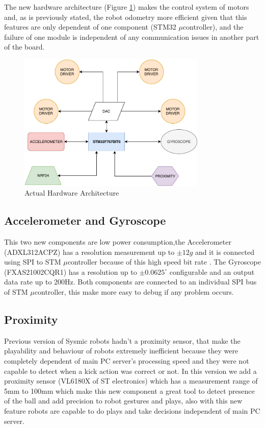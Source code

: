 \documentclass{llncs}
\begin{document}
The new hardware architecture (Figure \ref{fig:hw_new})
makes the control system of motors and, as is previously stated, the robot odometry more efficient given that this features are only dependent of one component (STM32 $\mu$controller), and the failure of one module is independent of any communication issues in another part of the board.

\begin{figure}[H]
    \centering
    \includegraphics[width=0.8\textwidth]{Images/HardwareNew.pdf}
    \caption{Actual Hardware Architecture}
    \label{fig:hw_new}
\end{figure}

\subsection{Accelerometer and Gyroscope} \label{sec:hw_accel}
\justify This two new components are low power consumption,the Accelerometer (ADXL312ACPZ) has a resolution measurement up to $\pm 12g$ and it is connected using SPI to STM $\mu$controller because of this high speed bit rate \cite{adxl312_datasheet}. The Gyroscope (FXAS21002CQR1) has a resolution up to $\pm 0.0625^\circ$ configurable and an output data rate up to 200Hz\cite{gyro_datasheet}. Both components are connected to an individual SPI bus of STM $\mu$controller, this make more easy to debug if any problem occurs.

\subsection{Proximity}
Previous version of Sysmic robots hadn't a proximity sensor, that make the playability and behaviour of robots extremely inefficient because they were completely dependent of main PC server's processing speed and they were not capable to detect when a kick action was correct or not. In this version we add a proximity sensor (VL6180X of ST electronics) which has a measurement range of 5mm to 100mm \cite{proximity_data} which make this new component a great tool to detect presence of the ball and add precision to robot gestures and plays, also with this new feature robots are capable to do plays and take decisions independent of main PC server.
\end{document}
